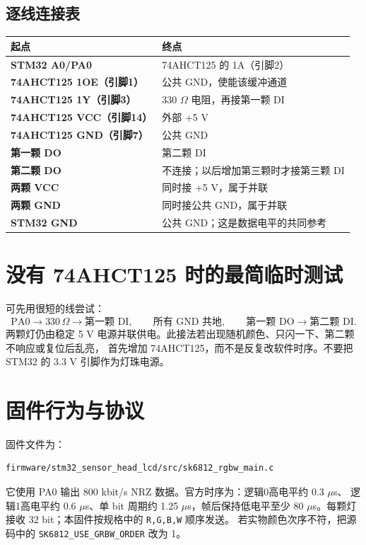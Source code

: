 \documentclass[UTF8,11pt]{ctexart}
\begin{document}
\subsection{逐线连接表}

\begin{longtable}{>{\bfseries}p{}p{}}
\toprule
起点 & 终点 \\
\midrule
STM32 A0/PA0 & 74AHCT125 的 1A（引脚2） \\
74AHCT125 1OE（引脚1） & 公共 GND，使能该缓冲通道 \\
74AHCT125 1Y（引脚3） & 330 $\Omega$ 电阻，再接第一颗 DI \\
74AHCT125 VCC（引脚14） & 外部 +5 V \\
74AHCT125 GND（引脚7） & 公共 GND \\
第一颗 DO & 第二颗 DI \\
第二颗 DO & 不连接；以后增加第三颗时才接第三颗 DI \\
两颗 VCC & 同时接 +5 V，属于并联 \\
两颗 GND & 同时接公共 GND，属于并联 \\
STM32 GND & 公共 GND；这是数据电平的共同参考 \\
\bottomrule
\end{longtable}

\section{没有 74AHCT125 时的最简临时测试}

可先用很短的线尝试：
\[
\text{PA0} \rightarrow 330\,\Omega \rightarrow \text{第一颗 DI},\qquad
\text{所有 GND 共地},\qquad
\text{第一颗 DO} \rightarrow \text{第二颗 DI}.
\]
两颗灯仍由稳定 5 V 电源并联供电。此接法若出现随机颜色、只闪一下、第二颗不响应或复位后乱亮，
首先增加 74AHCT125，而不是反复改软件时序。不要把 STM32 的 3.3 V 引脚作为灯珠电源。

\section{固件行为与协议}

固件文件为：
\begin{lstlisting}
firmware/stm32_sensor_head_lcd/src/sk6812_rgbw_main.c
\end{lstlisting}

它使用 PA0 输出 800 kbit/s NRZ 数据。官方时序为：逻辑0高电平约 0.3 $\mu$s、
逻辑1高电平约 0.6 $\mu$s、单 bit 周期约 1.25 $\mu$s，帧后保持低电平至少
80 $\mu$s。每颗灯接收 32 bit；本固件按规格中的 \texttt{R,G,B,W} 顺序发送。
若实物颜色次序不符，把源码中的 \texttt{SK6812\_USE\_GRBW\_ORDER} 改为 1。
\end{document}
